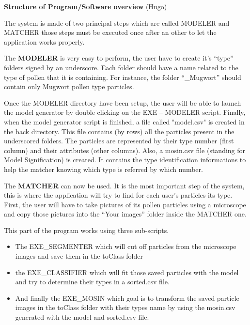 \textbf{Structure of Program/Software overview} (Hugo) 

The system is made of two principal steps which are called MODELER and MATCHER those steps must be executed once after an other to let the application works properly.

The \textbf{MODELER} is very easy to perform, the user have to create it's “type” folders signed by an underscore.
Each folder should have a name related to the type of pollen that it is containing. For instance, the folder “\_Mugwort” should contain only Mugwort pollen type particles.

Once the MODELER directory have been setup, the user will be able to launch the model generator by double clicking on the EXE – MODELER script.
Finally, when the model generator script is finished, a file called "model.csv" is created in the back directory. This file contains (by rows) all the particles present in the underscored folders. The particles are represented by their type number (first column) and their attributes (other columns). Also, a mosin.csv file (standing for Model Signification) is created. It contains the type identification informations to help the matcher knowing which type is referred by which number.

The \textbf{MATCHER} can now be used. It is the most important step of the system, this is where the application will try to find for each user's particles its type.
First, the user will have to take pictures of its pollen particles using a microscope and copy those pictures into the “Your images” folder inside the MATCHER one.

This part of the program works using three sub-scripts.

\begin{itemize}
\item The EXE\_SEGMENTER which will cut off particles from the microscope images and save them in the toClass folder

\item the EXE\_CLASSIFIER which will fit those saved particles with the model and try to determine their types in a sorted.csv file.

\item And finally the EXE\_MOSIN which goal is to transform the saved particle images in the toClass folder with their types name by using the mosin.csv generated with the model and sorted.csv file.
\end{itemize}
    
    
    
    
    
    
    
    
    
    
    
    
    
    
    